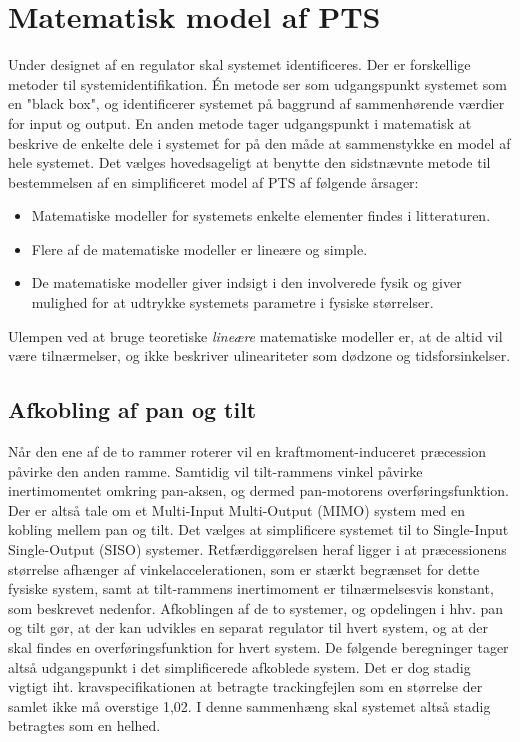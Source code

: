 \section{Matematisk model af PTS}
\label{sec:matPTS}
Under designet af en regulator skal systemet identificeres. Der er forskellige metoder til systemidentifikation.
Én metode ser som udgangspunkt systemet som en "black box", og identificerer systemet
på baggrund af sammenhørende værdier for input og output.
En anden metode tager udgangspunkt i matematisk at beskrive de enkelte dele i systemet
for på den måde at sammenstykke en model af hele systemet.
Det vælges hovedsageligt at benytte den sidstnævnte metode til bestemmelsen af en simplificeret
model af PTS af følgende årsager:
\begin{itemize}
\itemsep1pt
\item Matematiske modeller for systemets enkelte elementer findes i litteraturen.
\item Flere af de matematiske modeller er lineære og simple.
\item De matematiske modeller giver indsigt i den involverede fysik og giver mulighed
	for at udtrykke systemets parametre i fysiske størrelser.
\end{itemize}
Ulempen ved at bruge teoretiske \textit{lineære} matematiske modeller er,
at de altid vil være tilnærmelser, og ikke beskriver ulineariteter som dødzone og tidsforsinkelser.

\subsection{Afkobling af pan og tilt}
Når den ene af de to rammer roterer vil en kraftmoment-induceret præcession påvirke den anden ramme.
Samtidig vil tilt-rammens vinkel påvirke inertimomentet omkring pan-aksen, og dermed
pan-motorens overføringsfunktion.
Der er altså tale om et Multi-Input Multi-Output (MIMO) system med en kobling mellem pan og tilt.
Det vælges at simplificere systemet til to Single-Input Single-Output (SISO) systemer. %
Retfærdiggørelsen heraf ligger i at præcessionens størrelse afhænger af vinkelaccelerationen, som er stærkt begrænset
for dette fysiske system, samt at tilt-rammens inertimoment er tilnærmelsesvis konstant, som beskrevet nedenfor.
Afkoblingen af de to systemer, og opdelingen i hhv. pan og tilt gør, at der kan udvikles en separat regulator
til hvert system, og at der skal findes en overføringsfunktion for hvert system.
De følgende beregninger tager altså udgangspunkt i det simplificerede afkoblede system.
Det er dog stadig vigtigt iht. kravspecifikationen at betragte trackingfejlen som en størrelse der samlet
ikke må overstige 1,02\degree. I denne sammenhæng skal systemet altså stadig betragtes som en helhed.

